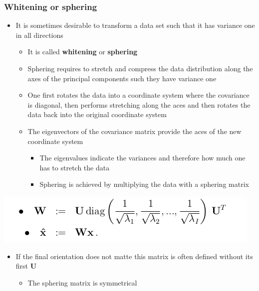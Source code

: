 \documentclass[11pt]{article}
\begin{document}
\subsubsection{Whitening or sphering}
\label{sec:orgcb2bd9d}
\begin{itemize}
\item It is sometimes desirable to transform a data set such that it has variance one in all directions
\begin{itemize}
\item It is called \textbf{whitening} or \textbf{sphering}
\item Sphering requires to stretch and compress the data distribution along the axes of the principal components such they have variance one
\item One first rotates the data into a coordinate system where the covariance is diagonal, then performs stretching along the aces and then rotates the data back into the original coordinate system
\item The eigenvectors of the covariance matrix provide the aces of the new coordinate system
\begin{itemize}
\item The eigenvalues indicate the variances and therefore how much one has to stretch the data
\item Sphering is achieved by multiplying the data with a sphering matrix
\end{itemize}
\end{itemize}
\end{itemize}
\begin{center}
\includegraphics[width=.9\linewidth]{Principal Component Analysis/screenshot_2018-11-20_22-50-23.png}
\end{center}
\begin{itemize}
\item If the final orientation does not matte this matrix is often defined without its first \(\pmb U\)
\begin{itemize}
\item The sphering matrix is symmetrical
\end{itemize}
\end{itemize}
\end{document}
